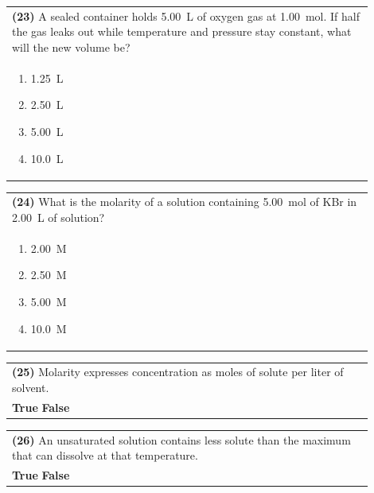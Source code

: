 \documentclass{article}
\begin{document}
\vspace{0.2cm}
\noindent\begin{tabular}{|p{0.9\linewidth}|}
\hline
\textbf{(23)} A sealed container holds 5.00~L of oxygen gas at 1.00~mol. If half the gas leaks out while temperature and pressure stay constant, what will the new volume be?\\[0.2cm]
\begin{minipage}[t]{0.85\linewidth}
\begin{enumerate}[label=\alph*.]
\item 1.25~L
\item 2.50~L
\item 5.00~L
\item 10.0~L
\end{enumerate}
\end{minipage}\\[0.2cm]
\hline
\end{tabular}

\vspace{0.2cm}
\noindent\begin{tabular}{|p{0.9\linewidth}|}
\hline
\textbf{(24)} What is the molarity of a solution containing 5.00~mol of KBr in 2.00~L of solution?\\[0.2cm]
\begin{minipage}[t]{0.85\linewidth}
\begin{enumerate}[label=\alph*.]
\item 2.00~M
\item 2.50~M
\item 5.00~M
\item 10.0~M
\end{enumerate}
\end{minipage}\\[0.2cm]
\hline
\end{tabular}
\newpage

\vspace{0.2cm}
\noindent\begin{tabular}{|p{0.9\linewidth}|}
\hline
\textbf{(25)} Molarity expresses concentration as moles of solute per liter of solvent.\\[0.2cm]
\textbf{True} \hspace{1cm} \textbf{False}\\[0.2cm]
\hline
\end{tabular}

\vspace{0.2cm}
\noindent\begin{tabular}{|p{0.9\linewidth}|}
\hline
\textbf{(26)} An unsaturated solution contains less solute than the maximum that can dissolve at that temperature.\\[0.2cm]
\textbf{True} \hspace{1cm} \textbf{False}\\[0.2cm]
\hline
\end{tabular}
\end{document}
